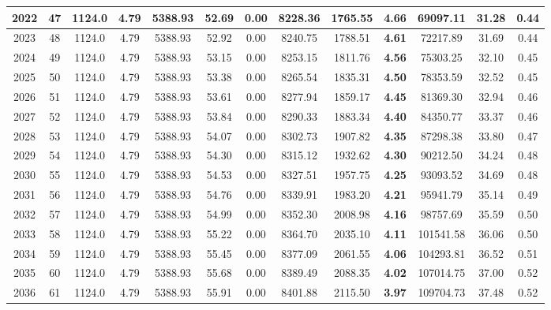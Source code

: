 {\begin{center}
\begin{tabular}[htb]{|c|c||c|c|c|c|c|c||c|c||c|c|c||}
\hline 
 2022 &  47 &  1124.0 &  4.79 &  5388.93 &  52.69 &  0.00 &  8228.36 &  1765.55 &  {\bf 4.66} &  69097.11 &  31.28 &  0.44 \\ 
\hline 
 2023 &  48 &  1124.0 &  4.79 &  5388.93 &  52.92 &  0.00 &  8240.75 &  1788.51 &  {\bf 4.61} &  72217.89 &  31.69 &  0.44 \\ 
\hline 
 2024 &  49 &  1124.0 &  4.79 &  5388.93 &  53.15 &  0.00 &  8253.15 &  1811.76 &  {\bf 4.56} &  75303.25 &  32.10 &  0.45 \\ 
\hline 
 2025 &  50 &  1124.0 &  4.79 &  5388.93 &  53.38 &  0.00 &  8265.54 &  1835.31 &  {\bf 4.50} &  78353.59 &  32.52 &  0.45 \\ 
\hline 
 2026 &  51 &  1124.0 &  4.79 &  5388.93 &  53.61 &  0.00 &  8277.94 &  1859.17 &  {\bf 4.45} &  81369.30 &  32.94 &  0.46 \\ 
\hline 
 2027 &  52 &  1124.0 &  4.79 &  5388.93 &  53.84 &  0.00 &  8290.33 &  1883.34 &  {\bf 4.40} &  84350.77 &  33.37 &  0.46 \\ 
\hline 
 2028 &  53 &  1124.0 &  4.79 &  5388.93 &  54.07 &  0.00 &  8302.73 &  1907.82 &  {\bf 4.35} &  87298.38 &  33.80 &  0.47 \\ 
\hline 
 2029 &  54 &  1124.0 &  4.79 &  5388.93 &  54.30 &  0.00 &  8315.12 &  1932.62 &  {\bf 4.30} &  90212.50 &  34.24 &  0.48 \\ 
\hline 
 2030 &  55 &  1124.0 &  4.79 &  5388.93 &  54.53 &  0.00 &  8327.51 &  1957.75 &  {\bf 4.25} &  93093.52 &  34.69 &  0.48 \\ 
\hline 
 2031 &  56 &  1124.0 &  4.79 &  5388.93 &  54.76 &  0.00 &  8339.91 &  1983.20 &  {\bf 4.21} &  95941.79 &  35.14 &  0.49 \\ 
\hline 
 2032 &  57 &  1124.0 &  4.79 &  5388.93 &  54.99 &  0.00 &  8352.30 &  2008.98 &  {\bf 4.16} &  98757.69 &  35.59 &  0.50 \\ 
\hline 
 2033 &  58 &  1124.0 &  4.79 &  5388.93 &  55.22 &  0.00 &  8364.70 &  2035.10 &  {\bf 4.11} &  101541.58 &  36.06 &  0.50 \\ 
\hline 
 2034 &  59 &  1124.0 &  4.79 &  5388.93 &  55.45 &  0.00 &  8377.09 &  2061.55 &  {\bf 4.06} &  104293.81 &  36.52 &  0.51 \\ 
\hline 
 2035 &  60 &  1124.0 &  4.79 &  5388.93 &  55.68 &  0.00 &  8389.49 &  2088.35 &  {\bf 4.02} &  107014.75 &  37.00 &  0.52 \\ 
\hline 
 2036 &  61 &  1124.0 &  4.79 &  5388.93 &  55.91 &  0.00 &  8401.88 &  2115.50 &  {\bf 3.97} &  109704.73 &  37.48 &  0.52 \\ 

\end{tabular}
\end{center}}
